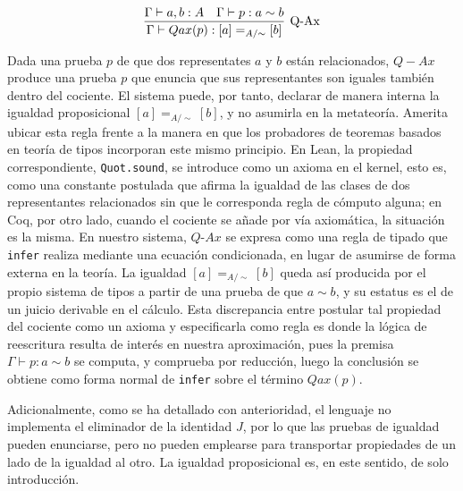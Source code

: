 \begin{gather}
  \infer[\text{Q-Ax}]
  {\Gamma \vdash Qax(p) : [a] =_{A/\sim} [b]}
  {\Gamma \vdash a, b : A \quad \Gamma \vdash p : a \sim b}
\end{gather}

Dada una prueba $p$ de que dos representates $a$ y $b$ están relacionados, $Q-Ax$ produce una prueba $p$ que enuncia que sus representantes son iguales también dentro del cociente. El sistema puede, por tanto, declarar de manera interna la igualdad proposicional $[a] =_{A/\sim} [b]$, y no asumirla en la metateoría.
\newline
\newline
\indent Amerita ubicar esta regla frente a la manera en que los probadores de teoremas basados en teoría de tipos incorporan este mismo principio. En Lean, la propiedad correspondiente, \texttt{Quot.sound}, se introduce como un axioma en el kernel, esto es, como una constante postulada que afirma la igualdad de las clases de dos representantes relacionados sin que le corresponda regla de cómputo alguna; en Coq, por otro lado, cuando el cociente se añade por vía axiomática, la situación es la misma. En nuestro sistema, $Q\text{-}Ax$ se expresa como una regla de tipado que \texttt{infer} realiza mediante una ecuación condicionada, en lugar de asumirse de forma externa en la teoría. La igualdad $[a] =_{A/\sim} [b]$ queda así producida por el propio sistema de tipos a partir de una prueba de que $a \sim b$, y su estatus es el de un juicio derivable en el cálculo. Esta discrepancia entre postular tal propiedad del cociente como un axioma y especificarla como regla es donde la lógica de reescritura resulta de interés en nuestra aproximación, pues la premisa $\Gamma \vdash p : a \sim b$ se computa, y comprueba por reducción, luego la conclusión se obtiene como forma normal de \texttt{infer} sobre el término $Qax(p)$.

Adicionalmente, como se ha detallado con anterioridad, el lenguaje no implementa el eliminador de la identidad $J$, por lo que las pruebas de igualdad pueden enunciarse, pero no pueden emplearse para transportar propiedades de un lado de la igualdad al otro. La igualdad proposicional es, en este sentido, de solo introducción.

